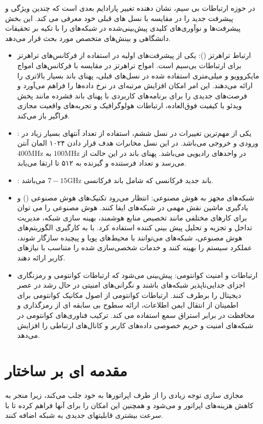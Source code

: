 در حوزه ارتباطات بی سیم،   نشان دهنده تغییر پارادایم بعدی است که چندین ویژگی و پیشرفت جدید را در مقایسه با نسل های قبلی خود معرفی می کند. این بخش پیشرفت‌ها و نوآوری‌های کلیدی پیش‌بینی‌شده در شبکه‌های   را با تکیه بر تحقیقات دانشگاهی و بینش‌های متخصص مورد بحث قرار می‌دهد.
\begin{itemize}
	\item
	 ارتباط تراهرتز (): یکی از پیشرفت‌های اولیه در  استفاده از فرکانس‌های تراهرتز برای ارتباطات بی‌سیم است. امواج تراهرتز در مقایسه با فرکانس‌های امواج مایکروویو و میلی‌متری استفاده شده در نسل‌های قبلی، پهنای باند بسیار بالاتری را ارائه می‌دهند. این امر امکان افزایش مرتبه‌ای در نرخ داده‌ها را فراهم می‌آورد و فرصت‌های جدیدی را برای برنامه‌های کاربردی با پهنای باند فشرده مانند پخش ویدئو با کیفیت فوق‌العاده، ارتباطات هولوگرافیک و تجربه‌های واقعیت مجازی فراگیر باز می‌کند.
	\item 
	:
	یکی از مهم‌ترین تغییرات در نسل ششم، استفاده از تعداد آنتهای بسیار زیاد در ورودی و خروجی می‌باشد.
	در این نسل مخابرات هدف قرار دادن ۱۰۲۴ المان آنتن در واحدهای رادیویی می‌باشد. پهنای باند در این حالت از 
	$100 \text{MHz}$
	به 
	$400 \text{MHz}$
	می‌رسد و  تعداد فرستنده و گیرنده به ۵۱۲ تا ارتقا می‌یابد.
	\item
	:
	باند جدید فرکانسی 
	که شامل باند فرکانسی 
	$7-15 \text{GHz}$
	می‌باشد.
	\item 
	شبکه‌های مجهز به هوش مصنوعی: انتظار می‌رود تکنیک‌های هوش مصنوعی () و یادگیری ماشین نقش مهمی در شبکه‌های   ایفا کنند. هوش مصنوعی را می توان برای کارهای مختلفی مانند تخصیص منابع هوشمند، بهینه سازی شبکه، مدیریت تداخل و تجزیه و تحلیل پیش بینی کننده استفاده کرد. با به کارگیری الگوریتم‌های هوش مصنوعی، شبکه‌های   می‌توانند با محیط‌های پویا و پیچیده سازگار شوند، عملکرد سیستم را بهینه کنند و خدمات شخصی‌سازی شده را متناسب با نیازهای کاربر ارائه دهند.
	\item 
	ارتباطات و امنیت کوانتومی: پیش‌بینی می‌شود که ارتباطات کوانتومی و رمزنگاری اجزای جدایی‌ناپذیر شبکه‌های   باشند و نگرانی‌های امنیتی در حال رشد در عصر دیجیتال را برطرف کنند. ارتباطات کوانتومی از اصول مکانیک کوانتومی برای اطمینان از انتقال ایمن اطلاعات، ارائه سطوح بی سابقه ای از رمزگذاری و محافظت در برابر استراق سمع استفاده می کند. ترکیب فناوری‌های کوانتومی در شبکه‌های   امنیت و حریم خصوصی داده‌های کاربر و کانال‌های ارتباطی را افزایش می‌دهد.
\end{itemize}
\section{مقدمه ای بر ساختار }
مجازی سازی  توجه زیادی را از طرف اپراتورها به خود جلب می‌کند، زیرا منجر به کاهش هزینه‌های اپراتور و  می‌شود و همچنین این امکان را برای آنها فراهم کرده تا با سرعت بیشتری قابلیتهای جدیدی به شبکه اضافه کنند.

